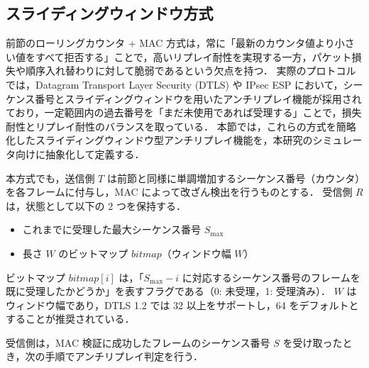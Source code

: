 \documentclass[twocolumn,10pt,a4paper]{jsarticle}
\begin{document}
\subsection{スライディングウィンドウ方式}

前節のローリングカウンタ + MAC 方式は，常に「最新のカウンタ値より小さい値をすべて拒否する」ことで，高いリプレイ耐性を実現する一方，パケット損失や順序入れ替わりに対して脆弱であるという欠点を持つ．
実際のプロトコルでは，Datagram Transport Layer Security (DTLS)\cite{RFC6347DTLS} や IPsec ESP\cite{rfc4303} において，シーケンス番号とスライディングウィンドウを用いたアンチリプレイ機能が採用されており，一定範囲内の過去番号を「まだ未使用であれば受理する」ことで，損失耐性とリプレイ耐性のバランスを取っている．
本節では，これらの方式を簡略化したスライディングウィンドウ型アンチリプレイ機能を，本研究のシミュレータ向けに抽象化して定義する．

本方式でも，送信側 $T$ は前節と同様に単調増加するシーケンス番号（カウンタ）を各フレームに付与し，MAC によって改ざん検出を行うものとする．
受信側 $R$ は，状態として以下の 2 つを保持する．

\begin{itemize}
 \item これまでに受理した最大シーケンス番号 $S_{\max}$
 \item 長さ $W$ のビットマップ $\mathit{bitmap}$（ウィンドウ幅 $W$）
\end{itemize}

ビットマップ $\mathit{bitmap}[i]$ は，「$S_{\max} - i$ に対応するシーケンス番号のフレームを既に受理したかどうか」を表すフラグである（0: 未受理，1: 受理済み）．
$W$ はウィンドウ幅であり，DTLS 1.2 では 32 以上をサポートし，64 をデフォルトとすることが推奨されている\cite{RFC6347DTLS}．

受信側は，MAC 検証に成功したフレームのシーケンス番号 $S$ を受け取ったとき，次の手順でアンチリプレイ判定を行う\cite{RFC6347DTLS,rfc4303}．
\end{document}

